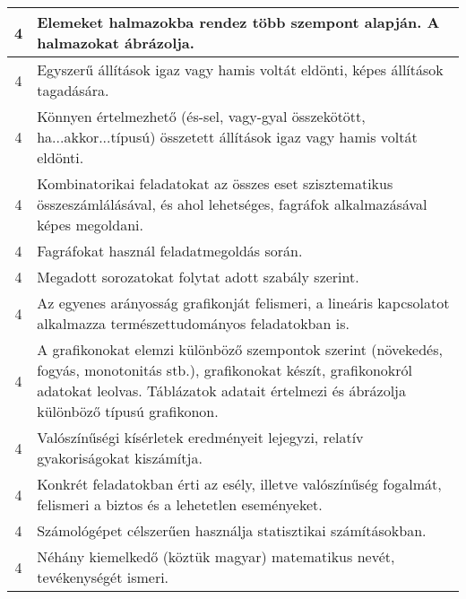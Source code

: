 \begin{longtable}{c | p{12cm} }
                                
                                          4 &  Elemeket halmazokba rendez több szempont alapján. A halmazokat ábrázolja. \\ \hline
                                          4 &  Egyszerű állítások igaz vagy hamis voltát eldönti, képes állítások tagadására. \\ \hline
                                          4 &  Könnyen értelmezhető (és-sel, vagy-gyal összekötött, ha...akkor...típusú) összetett állítások igaz vagy hamis voltát eldönti. \\ \hline
                                          4 &  Kombinatorikai feladatokat az összes eset szisztematikus összeszámlálásával, és ahol lehetséges, fagráfok alkalmazásával képes megoldani. \\ \hline
                                          4 &  Fagráfokat használ feladatmegoldás során. \\ \hline
                                          4 &  Megadott sorozatokat folytat adott szabály szerint. \\ \hline
                                          4 &  Az egyenes arányosság grafikonját felismeri, a lineáris kapcsolatot alkalmazza természettudományos feladatokban is. \\ \hline
                                          4 &  A grafikonokat elemzi különböző szempontok szerint (növekedés, fogyás, monotonitás stb.), grafikonokat készít, grafikonokról adatokat leolvas. Táblázatok adatait értelmezi és ábrázolja különböző típusú grafikonon. \\ \hline
                                          4 &  Valószínűségi kísérletek eredményeit lejegyzi, relatív gyakoriságokat kiszámítja. \\ \hline
                                          4 &  Konkrét feladatokban érti az esély, illetve valószínűség fogalmát, felismeri a biztos és a lehetetlen eseményeket. \\ \hline
                                          4 &  Számológépet célszerűen használja statisztikai számításokban. \\ \hline
                                          4 &  Néhány kiemelkedő (köztük magyar) matematikus nevét, tevékenységét ismeri. \\ \hline
                                      
                        \end{longtable}
            \clearpage

